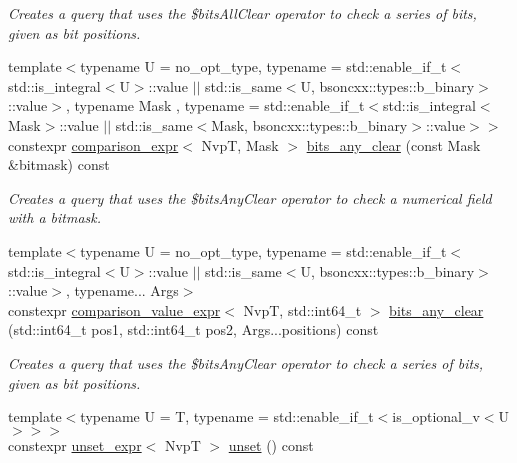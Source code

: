 \begin{DoxyCompactItemize}
\begin{DoxyCompactList}\small\item\em Creates a query that uses the \$bits\+All\+Clear operator to check a series of bits, given as bit positions. \end{DoxyCompactList}\item 
{\footnotesize template$<$typename U  = no\+\_\+opt\+\_\+type, typename  = std\+::enable\+\_\+if\+\_\+t$<$std\+::is\+\_\+integral$<$\+U$>$\+::value $\vert$$\vert$                                          std\+::is\+\_\+same$<$\+U, bsoncxx\+::types\+::b\+\_\+binary$>$\+::value$>$, typename Mask , typename  = std\+::enable\+\_\+if\+\_\+t$<$std\+::is\+\_\+integral$<$\+Mask$>$\+::value $\vert$$\vert$                                          std\+::is\+\_\+same$<$\+Mask, bsoncxx\+::types\+::b\+\_\+binary$>$\+::value$>$$>$ }\\constexpr \hyperlink{classmongo__odm_1_1comparison__expr}{comparison\+\_\+expr}$<$ NvpT, Mask $>$ \hyperlink{classmongo__odm_1_1nvp__base_a8bab15db45adb8a32e690373e18ad01f}{bits\+\_\+any\+\_\+clear} (const Mask \&bitmask) const 
\begin{DoxyCompactList}\small\item\em Creates a query that uses the \$bits\+Any\+Clear operator to check a numerical field with a bitmask. \end{DoxyCompactList}\item 
{\footnotesize template$<$typename U  = no\+\_\+opt\+\_\+type, typename  = std\+::enable\+\_\+if\+\_\+t$<$std\+::is\+\_\+integral$<$\+U$>$\+::value $\vert$$\vert$                                          std\+::is\+\_\+same$<$\+U, bsoncxx\+::types\+::b\+\_\+binary$>$\+::value$>$, typename... Args$>$ }\\constexpr \hyperlink{classmongo__odm_1_1comparison__value__expr}{comparison\+\_\+value\+\_\+expr}$<$ NvpT, std\+::int64\+\_\+t $>$ \hyperlink{classmongo__odm_1_1nvp__base_a68e02181f3393fd3d0ac0b6bb35cc1de}{bits\+\_\+any\+\_\+clear} (std\+::int64\+\_\+t pos1, std\+::int64\+\_\+t pos2, Args...\+positions) const 
\begin{DoxyCompactList}\small\item\em Creates a query that uses the \$bits\+Any\+Clear operator to check a series of bits, given as bit positions. \end{DoxyCompactList}\item 
{\footnotesize template$<$typename U  = T, typename  = std\+::enable\+\_\+if\+\_\+t$<$is\+\_\+optional\+\_\+v$<$\+U$>$$>$$>$ }\\constexpr \hyperlink{classmongo__odm_1_1unset__expr}{unset\+\_\+expr}$<$ NvpT $>$ \hyperlink{classmongo__odm_1_1nvp__base_aaef09e56ce567ddf207489771c0c30ae}{unset} () const 

\end{DoxyCompactItemize}
